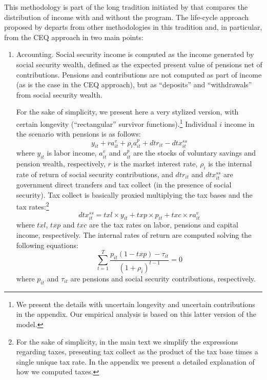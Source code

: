 \documentclass{article}
\begin{document}
This methodology is part of the long tradition initiated by \textcite{Musgrave1948} that compares the distribution of income with and without the program. The life-cycle approach proposed by \textcite{Forteza2023} departs from other methodologies in this tradition and, in particular, from the CEQ approach in two main points:
\begin{enumerate}
    \item Accounting. Social security income is computed as the income generated by social security wealth, defined as the expected present value of pensions net of contributions. Pensions and contributions are not computed as part of income (as is the case in the CEQ approach), but as ``deposits'' and ``withdrawals'' from social security wealth. 

    For the sake of simplicity, we present here a very stylized version, with certain longevity (``rectangular'' survivor functions).\footnote{We present the details with uncertain longevity and uncertain contributions in the appendix. Our empirical analysis is based on this latter version of the model. } Individual $i$ income in the scenario with pensions is as follows:
    \begin{equation} \label{income-with}
        y_{it} + ra_{it}^v+ \rho_i a_{it}^p  + dtr_{it} - dtx^{ss}_{it}  
    \end{equation}
    where $y_{it}$ is labor income, $a_{it}^v$ and $a_{it}^p$ are the stocks of voluntary savings and pension wealth, respectively, $r$ is the market interest rate, $\rho_i$ is the internal rate of return of social security contributions, and $dtr_{it}$ and $dtx^{ss}_{it}$ are government direct transfers and tax collect (in the presence of social security). Tax collect is basically proxied multiplying the tax bases and the tax rates:\footnote{For the sake of simplicity, in the main text we simplify the expressions regarding taxes, presenting tax collect as the product of the tax base times a single unique tax rate. In the appendix we present a detailed explanation of how we computed taxes.}
    \begin{equation}
        dtx^{ss}_{it} = txl \times y_{it} +  txp \times p_{it} + txc\times r a_{it}^v
    \end{equation}
    where $txl$, $txp$ and $txc$ are the tax rates on labor, pensions and capital income, respectively.
    The internal rates of return  are computed solving the following equations:
    \begin{equation} \sum_{t=1}^T \frac{p_{it}(1-txp)-\tau_{it}}{(1+{\rho_i})^{t-1}}=0
\label{eq:irr} \end{equation}
    where $p_{it}$ and $\tau_{it}$ are pensions and social security contributions, respectively.
    

\end{enumerate}
\end{document}

